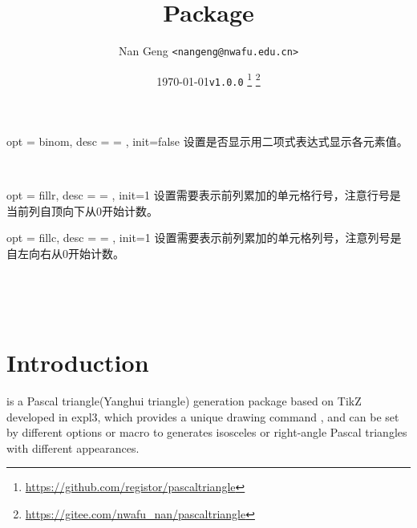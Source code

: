 \documentclass[full]{l3doc}
\def\vers{\texttt{v1.0.0}
\thanks{\url{https://github.com/registor/pascaltriangle}}
\thanks{\url{https://gitee.com/nwafu_nan/pascaltriangle}}
}
\begin{document}
\begin{documentation}
\bigskip

\begin{option}{opt = binom, desc = {= }, init=false}
  设置是否显示用二项式表达式显示各元素值。
\end{option}\\
\begin{SideBySideExample}[frame=single,numbers=left,xrightmargin=.63\linewidth,gobble=2]
  \centering
\end{SideBySideExample}

\bigskip

\begin{option}{ opt = fillr, desc = {= }, init=1 }
  设置需要表示前列累加的单元格行号，注意行号是当前列自顶向下从0开始计数。
\end{option}

\begin{option}{ opt = fillc, desc = {= }, init=1 }
  设置需要表示前列累加的单元格列号，注意列号是自左向右从0开始计数。
\end{option}\\
\begin{SideBySideExample}[frame=single,numbers=left,xrightmargin=.64\linewidth,gobble=2]
  \centering
  \\
\end{SideBySideExample}

\bigskip

\title{
  Package 
}
\author{Nan Geng \texttt{<nangeng@nwafu.edu.cn>}}
\date{\today\qquad \vers}
\maketitle

\section{Introduction}

 is a Pascal triangle(Yanghui triangle) generation package
based on TikZ developed in expl3, which provides a unique drawing command ,
and can be set by different options or  macro to
generates isosceles or right-angle Pascal triangles with different appearances.


\end{documentation}
\end{document}
